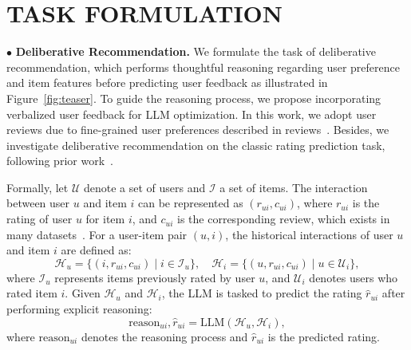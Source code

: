 \section{TASK FORMULATION}

\noindent$\bullet$ \textbf{Deliberative Recommendation.} 
We formulate the task of deliberative recommendation, which performs thoughtful reasoning regarding user preference and item features before predicting user feedback as illustrated in Figure~\ref{fig:teaser}. 
To guide the reasoning process, we propose incorporating verbalized user feedback for LLM optimization. 
In this work, we adopt user reviews due to fine-grained user preferences described in reviews~\cite{ReviewRecSurvey}. 
Besides, we investigate deliberative recommendation on the classic rating prediction task, following prior work~\cite{ACL_findings,expert}. 



Formally, let $\mathcal{U}$ denote a set of users and $\mathcal{I}$ a set of items. 
The interaction between user $u$ and item $i$ can be represented as $(r_{ui}, c_{ui})$, where $r_{ui}$ is the rating of user $u$ for item $i$, and $c_{ui}$ is the corresponding review, which exists in many datasets~\cite{movieLen,KaggleMovie}. 
For a user-item pair $(u, i)$, the historical interactions of user $u$ and item $i$ are defined as:  
\[
\mathcal{H}_u = \{(i, r_{ui}, c_{ui}) \mid i \in \mathcal{I}_u\}, \quad \mathcal{H}_i = \{(u, r_{ui}, c_{ui}) \mid u \in \mathcal{U}_i\},
\]  
where $\mathcal{I}_u$ represents items previously rated by user $u$, and $\mathcal{U}_i$ denotes users who rated item $i$. 
Given $\mathcal{H}_u$ and $\mathcal{H}_i$, the LLM is tasked to predict the rating $\hat{r}_{ui}$ after performing explicit reasoning:
\[
\text{reason}_{ui}, \hat{r}_{ui} = \text{LLM}(\mathcal{H}_u, \mathcal{H}_i),
\]
where $\text{reason}_{ui}$ denotes the reasoning process and $\hat{r}_{ui}$ is the predicted rating. 

